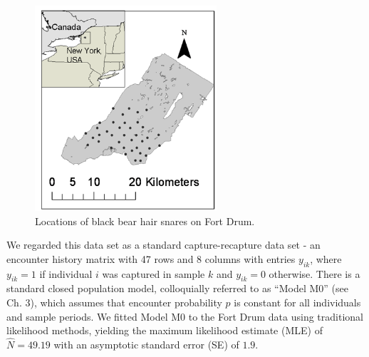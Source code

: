 \begin{figure}
\begin{center}
\includegraphics[height=3in]{Ch1/figs/hairsnares}
\end{center}
\caption{Locations of black bear hair snares on Fort Drum.}
\label{fig.hairsnares}
\end{figure}

We regarded this data set as a standard capture-recapture data set -
an encounter history matrix with 47 rows and 8 columns with entries $y_{ik}$, where 
$y_{ik}=1$ if individual $i$ was captured in sample $k$ and
$y_{ik}=0$ otherwise. There is a standard closed population model,
colloquially referred to as ``Model M0'' (see Ch. 3), which assumes
that encounter probability $p$ is constant for all individuals and
sample periods.  We fitted Model M0 to the Fort Drum data using
traditional likelihood methods, yielding the maximum likelihood
estimate (MLE) of $\hat{N} = 49.19$ with an asymptotic standard error
(SE) of $1.9$.

